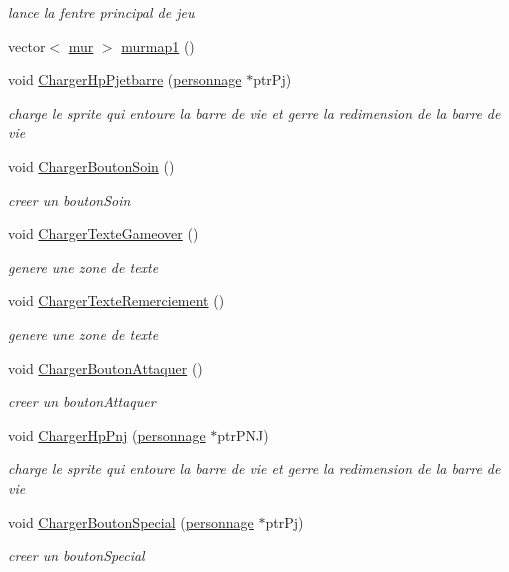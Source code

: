 \begin{DoxyCompactItemize}
\begin{DoxyCompactList}\small\item\em lance la fentre principal de jeu \end{DoxyCompactList}\item 
vector$<$ \mbox{\hyperlink{classmur}{mur}} $>$ \mbox{\hyperlink{classjeu_a4671d4fd828d6709ca472994855ab4ff}{murmap1}} ()
\item 
void \mbox{\hyperlink{classjeu_a2793dcdba700455a3b1353dcc18a048e}{Charger\+Hp\+Pjetbarre}} (\mbox{\hyperlink{classpersonnage}{personnage}} $\ast$ptr\+Pj)
\begin{DoxyCompactList}\small\item\em charge le sprite qui entoure la barre de vie et gerre la redimension de la barre de vie \end{DoxyCompactList}\item 
void \mbox{\hyperlink{classjeu_a176fa4a5355a3529a833592d8f81294e}{Charger\+Bouton\+Soin}} ()
\begin{DoxyCompactList}\small\item\em creer un bouton\+Soin \end{DoxyCompactList}\item 
void \mbox{\hyperlink{classjeu_a79b4c4305a9aa1dde4183547ffb94203}{Charger\+Texte\+Gameover}} ()
\begin{DoxyCompactList}\small\item\em genere une zone de texte \end{DoxyCompactList}\item 
void \mbox{\hyperlink{classjeu_a3c2e2246dd5ee2d41ccf37c7e78262d0}{Charger\+Texte\+Remerciement}} ()
\begin{DoxyCompactList}\small\item\em genere une zone de texte \end{DoxyCompactList}\item 
void \mbox{\hyperlink{classjeu_a9d82e7f21e8863d1ed8bc7ef7d7aec87}{Charger\+Bouton\+Attaquer}} ()
\begin{DoxyCompactList}\small\item\em creer un bouton\+Attaquer \end{DoxyCompactList}\item 
void \mbox{\hyperlink{classjeu_a6cf6a0482228d4b76ba62a6589aab74e}{Charger\+Hp\+Pnj}} (\mbox{\hyperlink{classpersonnage}{personnage}} $\ast$ptr\+P\+NJ)
\begin{DoxyCompactList}\small\item\em charge le sprite qui entoure la barre de vie et gerre la redimension de la barre de vie \end{DoxyCompactList}\item 
void \mbox{\hyperlink{classjeu_a78dcb0b1f6e462a994ddcf28ce059115}{Charger\+Bouton\+Special}} (\mbox{\hyperlink{classpersonnage}{personnage}} $\ast$ptr\+Pj)
\begin{DoxyCompactList}\small\item\em creer un bouton\+Special \end{DoxyCompactList}\end{DoxyCompactItemize}
